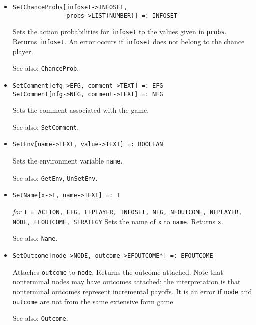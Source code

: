 \begin{itemize}
\item{}
\protect \large \begin{verbatim} 
SetChanceProbs[infoset->INFOSET, 
               probs->LIST(NUMBER)] =: INFOSET 
\end{verbatim}\normalsize

\bd
Sets the action probabilities for 
\verb+infoset+ to the values given in \verb+probs+.  Returns \verb+infoset+. 
An error occurs if \verb+infoset+ does not belong to the chance player.
\item [See also:] \verb+ChanceProb+.
\ed

\item{}
\protect \large \begin{verbatim}
SetComment[efg->EFG, comment->TEXT] =: EFG
SetComment[nfg->NFG, comment->TEXT] =: NFG
\end{verbatim} \normalsize

\bd
Sets the comment associated with the game.
\item [See also:] \verb+SetComment+.
\ed

\item{}
\protect \large \begin{verbatim}
SetEnv[name->TEXT, value->TEXT] =: BOOLEAN 
\end{verbatim} \normalsize

\bd
Sets the environment variable \verb+name+.
\item [See also:] \verb+GetEnv+, \verb+UnSetEnv+.
\ed

\item{}
\protect \large \begin{verbatim}
SetName[x->T, name->TEXT] =: T
\end{verbatim}\normalsize

{\it for} {\tt T = ACTION, EFG, EFPLAYER, INFOSET, NFG, NFOUTCOME, 
NFPLAYER, NODE, EFOUTCOME, STRATEGY}
\bd
Sets the name of \verb+x+ to \verb+name+.  Returns \verb+x+.
\item [See also:] \verb+Name+.
\ed

\item{}
\protect \large \begin{verbatim} 
SetOutcome[node->NODE, outcome->EFOUTCOME*] =: EFOUTCOME 
\end{verbatim}\normalsize

\bd
Attaches \verb+outcome+ to \verb+node+.  Returns the outcome attached.
Note that nonterminal nodes may have outcomes attached; the interpretation
is that nonterminal outcomes represent incremental payoffs.  
It is an error if \verb+node+ and \verb+outcome+ are not from the same
extensive form game.
\item [See also:] \verb+Outcome+.
\ed


\end{itemize}
